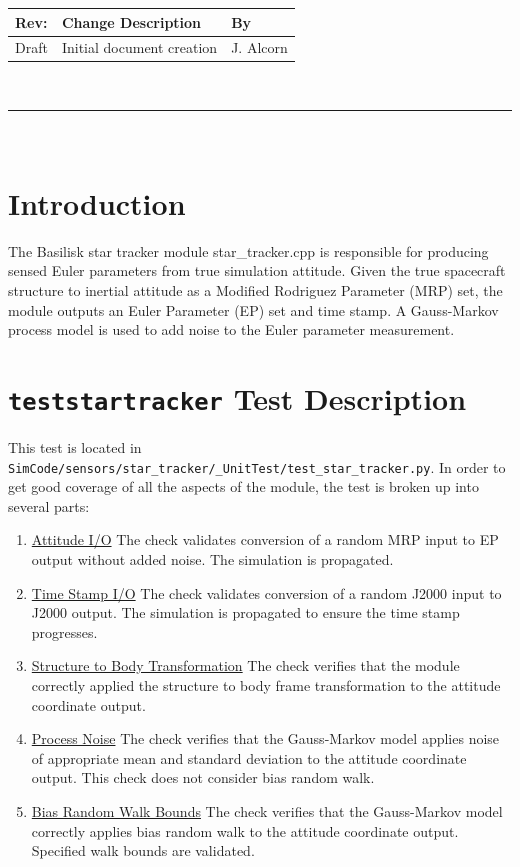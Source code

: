 \documentclass[]{BasiliskReportMemo}
\begin{document}
\makeCover


%
%
\pagestyle{empty}
{\renewcommand{\arraystretch}{1.1}
\noindent
\begin{longtable}{|p{0.5in}|p{4.5in}|p{1.14in}|}
\hline
{\bfseries Rev}: & {\bfseries Change Description} & {\bfseries By} \\
\hline
Draft & Initial document creation & J. Alcorn \\
\hline

\end{longtable}
}

\newpage
\setcounter{page}{1}
\pagestyle{fancy}

\tableofcontents
~\\ \hrule ~\\


\section{Introduction}
The Basilisk star tracker module star\_tracker.cpp is responsible for producing sensed Euler parameters from true simulation attitude. Given the true spacecraft structure to inertial attitude as a Modified Rodriguez Parameter (MRP) set, the module outputs an Euler Parameter (EP) set and time stamp. A Gauss-Markov process model is used to add noise to the Euler parameter measurement.

\section{{\tt test\textunderscore star\textunderscore tracker} Test Description}

This test is located in {\tt SimCode/sensors/star\_tracker/\_UnitTest/test\_star\_tracker.py}. In order to get good coverage of all the aspects of the module, the test is broken up into several parts: \par

\begin{enumerate}
	\item \underline{Attitude I/O} The check validates conversion of a random MRP input to EP output without added noise. The simulation is propagated.
	\item \underline{Time Stamp I/O} The check validates conversion of a random J2000 input to J2000 output. The simulation is propagated to ensure the time stamp progresses.
	\item \underline{Structure to Body Transformation} The check verifies that the module correctly applied the structure to body frame transformation to the attitude coordinate output.
	\item \underline{Process Noise} The check verifies that the Gauss-Markov model applies noise of appropriate mean and standard deviation to the attitude coordinate output. This check does not consider bias random walk.
	\item \underline{Bias Random Walk Bounds} The check verifies that the Gauss-Markov model correctly applies bias random walk to the attitude coordinate output. Specified walk bounds are validated.
\end{enumerate} 
\end{document}
